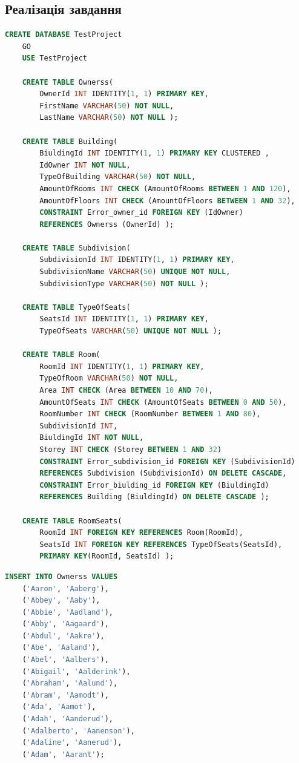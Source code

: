 \documentclass[a4paper,12pt]{article}
\begin{document}
\newpage
	\begin{center}
		\section*{\bfseries{Реалізація завдання}}
	\end{center}

	\begin{lstlisting}[language=SQL]
	CREATE DATABASE TestProject
	GO
	USE TestProject
	
	CREATE TABLE Ownerss(
		OwnerId INT IDENTITY(1, 1) PRIMARY KEY,
		FirstName VARCHAR(50) NOT NULL,
		LastName VARCHAR(50) NOT NULL );
	
	CREATE TABLE Building(
		BiuldingId INT IDENTITY(1, 1) PRIMARY KEY CLUSTERED ,
		IdOwner INT NOT NULL,
		TypeOfBuilding VARCHAR(50) NOT NULL,
		AmountOfRooms INT CHECK (AmountOfRooms BETWEEN 1 AND 120),
		AmountOfFloors INT CHECK (AmountOfFloors BETWEEN 1 AND 32),
		CONSTRAINT Error_owner_id FOREIGN KEY (IdOwner) 
		REFERENCES Ownerss (OwnerId) );
	
	CREATE TABLE Subdivision(
		SubdivisionId INT IDENTITY(1, 1) PRIMARY KEY,
		SubdivisionName VARCHAR(50) UNIQUE NOT NULL,
		SubdivisionType VARCHAR(50) NOT NULL );
	
	CREATE TABLE TypeOfSeats(
		SeatsId INT IDENTITY(1, 1) PRIMARY KEY,
		TypeOfSeats VARCHAR(50) UNIQUE NOT NULL ); 
	
	CREATE TABLE Room(
		RoomId INT IDENTITY(1, 1) PRIMARY KEY,
		TypeOfRoom VARCHAR(50) NOT NULL,
		Area INT CHECK (Area BETWEEN 10 AND 70), 
		AmountOfSeats INT CHECK (AmountOfSeats BETWEEN 0 AND 50), 
		RoomNumber INT CHECK (RoomNumber BETWEEN 1 AND 80), 
		SubdivisionId INT,
		BiuldingId INT NOT NULL,
		Storey INT CHECK (Storey BETWEEN 1 AND 32)
		CONSTRAINT Error_subdivision_id FOREIGN KEY (SubdivisionId) 
		REFERENCES Subdivision (SubdivisionId) ON DELETE CASCADE,
		CONSTRAINT Error_biulding_id FOREIGN KEY (BiuldingId) 
		REFERENCES Building (BiuldingId) ON DELETE CASCADE );
	
	CREATE TABLE RoomSeats(
		RoomId INT FOREIGN KEY REFERENCES Room(RoomId),
		SeatsId INT FOREIGN KEY REFERENCES TypeOfSeats(SeatsId),
		PRIMARY KEY(RoomId, SeatsId) );
	\end{lstlisting}

\newpage
	\begin{lstlisting}[language=SQL]
	INSERT INTO Ownerss VALUES
	('Aaron', 'Aaberg'),
	('Abbey', 'Aaby'),
	('Abbie', 'Aadland'),
	('Abby', 'Aagaard'),
	('Abdul', 'Aakre'),
	('Abe', 'Aaland'),
	('Abel', 'Aalbers'),
	('Abigail', 'Aalderink'),
	('Abraham', 'Aalund'),
	('Abram', 'Aamodt'),
	('Ada', 'Aamot'),
	('Adah', 'Aanderud'),
	('Adalberto', 'Aanenson'),
	('Adaline', 'Aanerud'),
	('Adam', 'Aarant');
	\end{lstlisting}
\end{document}
